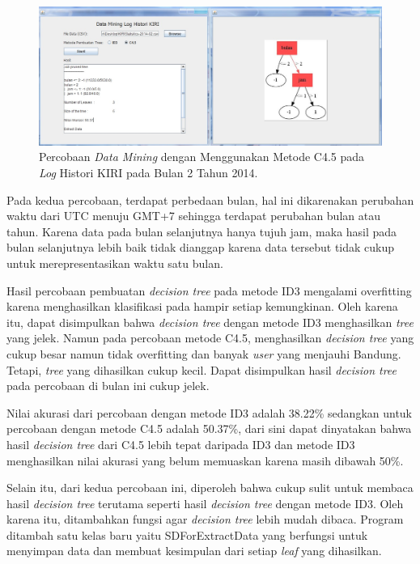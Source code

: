 \begin{figure}[H]
\centering
\includegraphics[scale=0.3]{Gambar/percobaan2.jpg}
\caption[Percobaan \textsl{Data Mining} dengan Menggunakan Metode C4.5 pada \textsl{Log} Histori KIRI pada Bulan 2 Tahun 2014]{Percobaan \textsl{Data Mining} dengan Menggunakan Metode C4.5 pada \textsl{Log} Histori KIRI pada Bulan 2 Tahun 2014.} 
\label{fig:percobaan2}
\end{figure}

Pada kedua percobaan, terdapat perbedaan bulan, hal ini dikarenakan perubahan waktu dari UTC menuju GMT+7 sehingga terdapat perubahan bulan atau tahun. Karena data pada bulan selanjutnya hanya tujuh jam, maka hasil pada bulan selanjutnya lebih baik tidak dianggap karena data tersebut tidak cukup untuk merepresentasikan waktu satu bulan.

Hasil percobaan pembuatan \textsl{decision tree} pada metode ID3 mengalami overfitting karena menghasilkan klasifikasi pada hampir setiap kemungkinan. Oleh karena itu, dapat disimpulkan bahwa \textsl{decision tree} dengan metode ID3 menghasilkan \textsl{tree} yang jelek. Namun pada percobaan metode C4.5, menghasilkan \textsl{decision tree} yang cukup besar namun tidak overfitting dan banyak \textsl{user} yang menjauhi Bandung. Tetapi, \textsl{tree} yang dihasilkan cukup kecil. Dapat disimpulkan hasil \textsl{decision tree} pada percobaan di bulan ini cukup jelek.

Nilai akurasi dari percobaan dengan metode ID3 adalah 38.22\% sedangkan untuk percobaan dengan metode C4.5 adalah 50.37\%, dari sini dapat dinyatakan bahwa hasil \textsl{decision tree} dari C4.5 lebih tepat daripada ID3 dan metode ID3 menghasilkan nilai akurasi yang belum memuaskan karena masih dibawah 50\%.

Selain itu, dari kedua percobaan ini, diperoleh bahwa cukup sulit untuk membaca hasil \textsl{decision tree} terutama seperti hasil \textsl{decision tree} dengan metode ID3. Oleh karena itu, ditambahkan fungsi agar \textsl{decision tree} lebih mudah dibaca. Program ditambah satu kelas baru yaitu SDForExtractData yang berfungsi untuk menyimpan data dan membuat kesimpulan dari setiap \textsl{leaf} yang dihasilkan.

